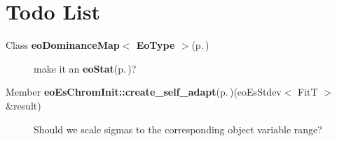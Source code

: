 \section{Todo List}\label{todo}
\label{todo__todo000001}
 \begin{description}
\item[Class {\bf eo\-Dominance\-Map$<$ Eo\-Type $>$}{\rm (p.\,\pageref{classeo_dominance_map})} ]make it an {\bf eo\-Stat}{\rm (p.\,\pageref{classeo_stat})}? \end{description}


\label{todo__todo000002}
 \begin{description}
\item[Member {\bf eo\-Es\-Chrom\-Init::create\_\-self\_\-adapt}{\rm (p.\,\pageref{classeo_es_chrom_init_d2})}(eo\-Es\-Stdev$<$ Fit\-T $>$ \&result) ]Should we scale sigmas to the corresponding object variable range? \end{description}
